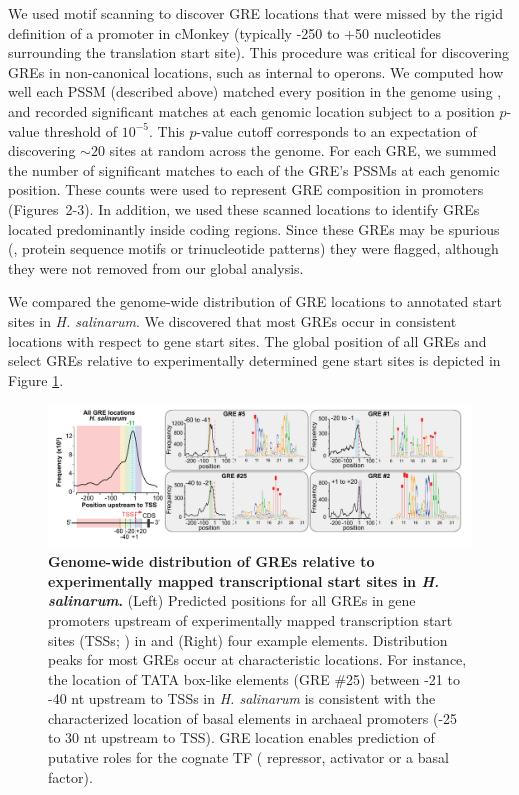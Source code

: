 We used motif scanning to discover GRE locations that were missed by
the rigid definition of a promoter in cMonkey (typically -250 to +50
nucleotides surrounding the translation start site). This procedure
was critical for discovering GREs in non-canonical locations, such as
internal to operons. We computed how well each PSSM (described above)
matched every position in the genome
using  \cite{Bailey1998}, and recorded significant
matches at each genomic location subject to a position $p$-value
threshold of $10^{-5}$. This $p$-value cutoff corresponds to an
expectation of discovering $\sim 20$ sites at random across the
genome. For each GRE, we summed the number of significant matches to
each of the GRE’s PSSMs at each genomic position. These counts were
used to represent GRE composition in promoters (Figures~2-3). In
addition, we used these scanned locations to identify GREs located
predominantly inside coding regions. Since these GREs may be spurious
(\eg, protein sequence motifs or trinucleotide patterns) they were
flagged, although they were not removed from our global analysis.

We compared the genome-wide distribution of GRE locations to annotated
start sites in \textit{H. salinarum}.  We discovered that most GREs
occur in consistent locations with respect to gene start sites.  The
global position of all GREs and select GREs relative to experimentally
determined gene start sites is depicted in
Figure \ref{fig:gre_global_locs_hal}.

\begin{figure}[hp]
\centering
\includegraphics[width=0.95\linewidth]{figures/gre_global_locs_hal.pdf}
\caption[Genome-wide distribution of GREs relative to experimentally mapped transcriptional start sites in \textit{H. salinarum}]{\textbf{Genome-wide distribution of GREs relative to experimentally mapped transcriptional start sites in \textit{H. salinarum}.} (Left) Predicted positions for all GREs in gene promoters upstream of experimentally mapped transcription start sites (TSSs; \cite{Koide2009}) in and (Right) four example elements. Distribution peaks for most GREs occur at characteristic locations. For instance, the location of TATA box-like elements
(GRE \#25) between -21 to -40 nt upstream to TSSs in {\it
H. salinarum} is consistent with the characterized location of basal
elements in archaeal promoters (-25 to 30 nt upstream to TSS). GRE
location enables prediction of putative roles for the cognate TF (\eg
repressor, activator or a basal factor).}
\label{fig:gre_global_locs_hal}
\end{figure}

